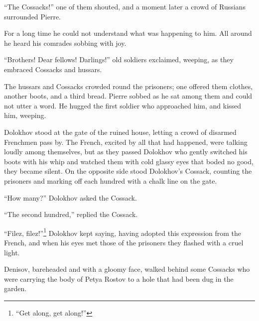 ``The Cossacks!'' one of them shouted, and a moment later a crowd
of Russians surrounded Pierre.

For a long time he could not understand what was happening to
him. All around he heard his comrades sobbing with joy.

``Brothers! Dear fellows! Darlings!'' old soldiers exclaimed,
weeping, as they embraced Cossacks and hussars.

The hussars and Cossacks crowded round the prisoners; one offered
them clothes, another boots, and a third bread. Pierre sobbed as
he sat among them and could not utter a word. He hugged the first
soldier who approached him, and kissed him, weeping.

Dolokhov stood at the gate of the ruined house, letting a crowd
of disarmed Frenchmen pass by. The French, excited by all that
had happened, were talking loudly among themselves, but as they
passed Dolokhov who gently switched his boots with his whip and
watched them with cold glassy eyes that boded no good, they
became silent. On the opposite side stood Dolokhov's Cossack,
counting the prisoners and marking off each hundred with a chalk
line on the gate.

``How many?'' Dolokhov asked the Cossack.

``The second hundred,'' replied the Cossack.

``Filez, filez!''\footnote{``Get along, get along!''} Dolokhov
kept saying, having adopted this expression from the French, and
when his eyes met those of the prisoners they flashed with a
cruel light.

Denisov, bareheaded and with a gloomy face, walked behind some
Cossacks who were carrying the body of Petya Rostov to a hole
that had been dug in the garden.


